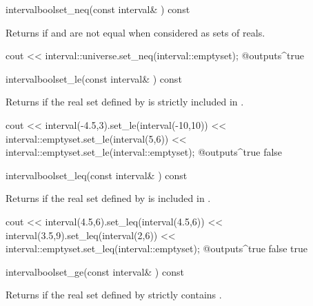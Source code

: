 \documentclass{manual}
\let\leq=\leqslant
\let\geq=\geqslant
\begin{document}
\begin{defmethod}{interval}{bool}{set\_neq}{(const interval\& ) const}
    \begin{operation}
    \end{operation}
    Returns  if  and  are not equal when
    considered as sets of reals.
    \begin{example}
cout << interval::universe.set_neq(interval::emptyset);
@outputs^true~
    \end{example}
\end{defmethod}

\begin{defmethod}{interval}{bool}{set\_le}{(const interval\& ) const}
  \begin{operation}
  \end{operation}
Returns  if the real set defined by  is strictly included in .
\begin{example}
cout << interval(-4.5,3).set_le(interval(-10,10))
     << interval::emptyset.set_le(interval(5,6))
     << interval::emptyset.set_le(interval::emptyset);
@outputs^true false~
\end{example}
\end{defmethod}

\begin{defmethod}{interval}{bool}{set\_leq}{(const interval\& ) const}
  \begin{operation}
    \op{$\forall x\in \code{self}, \exists y\in I\colon x\leq y \wedge
\forall y\in I, \exists x \in \code{self}\colon y\geq x$}
  \end{operation}
Returns  if the real set defined by  is included in .
\begin{example}
cout << interval(4.5,6).set_leq(interval(4.5,6))
     << interval(3.5,9).set_leq(interval(2,6))
     << interval::emptyset.set_leq(interval::emptyset);
@outputs^true false true~
\end{example}
\end{defmethod}

\begin{defmethod}{interval}{bool}{set\_ge}{(const interval\& ) const}
  \begin{operation}
  \end{operation}
Returns  if the real set defined by  strictly contains
.
\end{defmethod}
\end{document}
